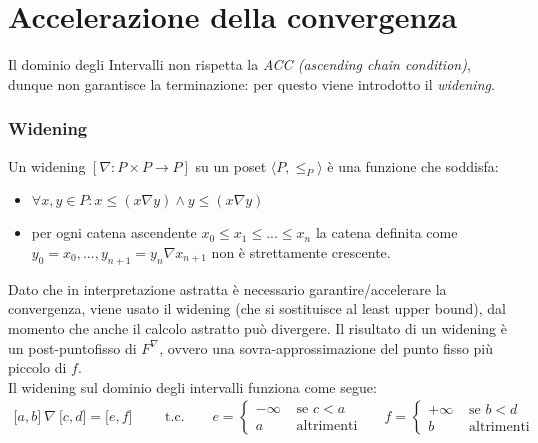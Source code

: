\documentclass[a4paper, 10pt]{report}
\begin{document}
\section*{Accelerazione della convergenza}
Il dominio degli Intervalli non rispetta la \textit{ACC (ascending chain condition)}, dunque non garantisce la terminazione: per questo viene introdotto il \textit{widening}.

\subsubsection*{Widening}
Un widening $[ \nabla : P \times P \to P  ]$ su un poset $ \langle P, \leq_P \rangle $ è una funzione che soddisfa:
\begin{itemize}
	\item $\forall x,y \in P : x \leq (x \nabla y ) \wedge y \leq (x \nabla y)$
	\item per ogni catena ascendente $x_0 \leq x_1 \leq ... \leq x_n$ la catena definita come $y_0 = x_0, ..., y_{n+1} = y_n \nabla x_{n+1}$ non è strettamente crescente.
\end{itemize}

\noindent
Dato che in interpretazione astratta è necessario garantire/accelerare la convergenza, viene usato il widening (che si sostituisce al least upper bound), dal momento che anche il calcolo astratto può divergere.
Il risultato di un widening è un post-puntofisso  di $F^\nabla$, ovvero una sovra-approssimazione del punto fisso più piccolo di $f$.
\\
Il widening sul dominio degli intervalli funziona come segue:
\begin{align*}
\lbrack a, b \rbrack\ \nabla\ \lbrack c, d \rbrack = \lbrack e, f \rbrack \qquad \text{ t.c. ~~~~~}
e = 
\begin{cases}
-\infty &\text{ se } c < a \\
a &\text{ altrimenti}
\end{cases}
~~~~~~~f = 
\begin{cases}
+\infty &\text{ se } b < d\\
b &\text{ altrimenti }
\end{cases}
\end{align*}
\end{document}
